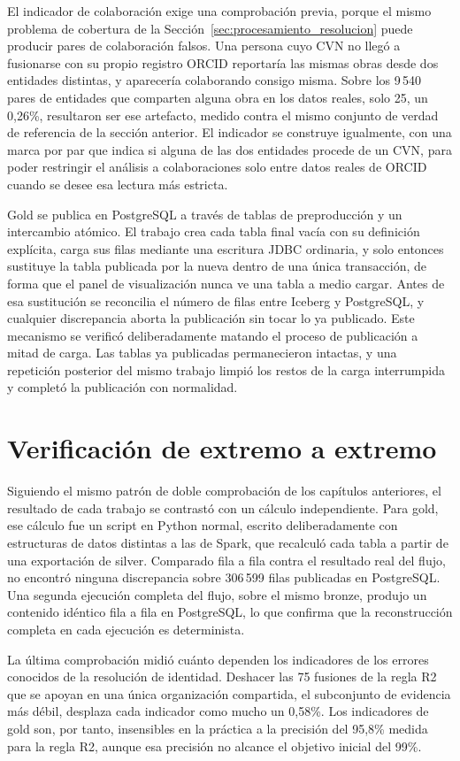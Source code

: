 El indicador de colaboración exige una comprobación previa, porque el
mismo problema de cobertura de la Sección~\ref{sec:procesamiento_resolucion}
puede producir pares de colaboración falsos. Una persona cuyo CVN no llegó
a fusionarse con su propio registro ORCID reportaría las mismas obras
desde dos entidades distintas, y aparecería colaborando consigo misma.
Sobre los 9\,540 pares de entidades que comparten alguna obra en los datos
reales, solo 25, un 0,26\%, resultaron ser ese artefacto, medido contra el
mismo conjunto de verdad de referencia de la sección anterior. El
indicador se construye igualmente, con una marca por par que indica si
alguna de las dos entidades procede de un CVN, para poder restringir el
análisis a colaboraciones solo entre datos reales de ORCID cuando se desee
esa lectura más estricta.

Gold se publica en PostgreSQL a través de tablas de preproducción y un
intercambio atómico. El trabajo crea cada tabla final vacía con su
definición explícita, carga sus filas mediante una escritura JDBC
ordinaria, y solo entonces sustituye la tabla publicada por la nueva
dentro de una única transacción, de forma que el panel de visualización
nunca ve una tabla a medio cargar. Antes de esa sustitución se reconcilia
el número de filas entre Iceberg y PostgreSQL, y cualquier discrepancia
aborta la publicación sin tocar lo ya publicado. Este mecanismo se
verificó deliberadamente matando el proceso de publicación a mitad de
carga. Las tablas ya publicadas permanecieron intactas, y una repetición
posterior del mismo trabajo limpió los restos de la carga interrumpida y
completó la publicación con normalidad.

\section{Verificación de extremo a extremo}
\label{sec:procesamiento_verificacion}

Siguiendo el mismo patrón de doble comprobación de los capítulos
anteriores, el resultado de cada trabajo se contrastó con un cálculo
independiente. Para gold, ese cálculo fue un script en Python normal,
escrito deliberadamente con estructuras de datos distintas a las de Spark,
que recalculó cada tabla a partir de una exportación de silver. Comparado
fila a fila contra el resultado real del flujo, no encontró ninguna
discrepancia sobre 306\,599 filas publicadas en PostgreSQL. Una segunda
ejecución completa del flujo, sobre el mismo bronze, produjo un contenido
idéntico fila a fila en PostgreSQL, lo que confirma que la reconstrucción
completa en cada ejecución es determinista.

La última comprobación midió cuánto dependen los indicadores de los
errores conocidos de la resolución de identidad. Deshacer las 75 fusiones
de la regla R2 que se apoyan en una única organización compartida, el
subconjunto de evidencia más débil, desplaza cada indicador como mucho un
0,58\%. Los indicadores de gold son, por tanto, insensibles en la práctica
a la precisión del 95,8\% medida para la regla R2, aunque esa precisión no
alcance el objetivo inicial del 99\%.
